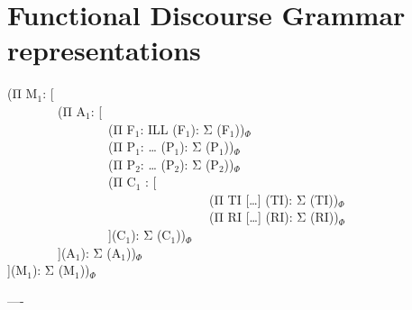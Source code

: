 \chapter{Functional Discourse Grammar representations}
\ea
(Π M$_1$: [\\
~~~~~~~~(Π A$_1$: [\\
~~~~~~~~~~~~~~~~(Π F$_1$: ILL (F$_1$): Σ (F$_1$))$_\Phi$\\
~~~~~~~~~~~~~~~~(Π P$_1$: {\dots} (P$_1$): Σ (P$_1$))$_\Phi$\\
~~~~~~~~~~~~~~~~(Π P$_2$: {\dots} (P$_2$): Σ (P$_2$))$_\Phi$\\
~~~~~~~~~~~~~~~~(Π C$_1$ : [\\
~~~~~~~~~~~~~~~~~~~~~~~~~~~~~~~~(Π TI [{\dots}] (TI): Σ (TI))$_\Phi$\\
~~~~~~~~~~~~~~~~~~~~~~~~~~~~~~~~(Π RI [{\dots}] (RI): Σ (RI))$_\Phi$\\
~~~~~~~~~~~~~~~~](C$_1$): Σ (C$_1$))$_\Phi$\\
~~~~~~~~](A$_1$): Σ (A$_1$))$_\Phi$\\
](M$_1$): Σ (M$_1$))$_\Phi$ \\
\z

----

